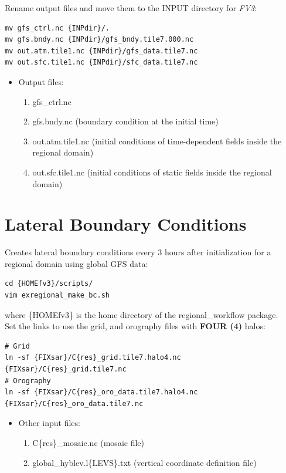 \documentclass[11pt,fleqn]{report}              %
\begin{document}
Rename output files and move them to the INPUT directory for {\it FV3}:
\lstset{language=bash}   
\begin{lstlisting}[frame=trBL]
mv gfs_ctrl.nc {INPdir}/.
mv gfs.bndy.nc {INPdir}/gfs_bndy.tile7.000.nc
mv out.atm.tile1.nc {INPdir}/gfs_data.tile7.nc
mv out.sfc.tile1.nc {INPdir}/sfc_data.tile7.nc
\end{lstlisting}

\begin{itemize}
\item Output files:
\begin{enumerate}
\item gfs\_ctrl.nc
\item gfs.bndy.nc (boundary condition at the initial time)
\item out.atm.tile1.nc (initial conditions of time-dependent fields inside the regional domain)
\item out.sfc.tile1.nc (initial conditions of static fields inside the regional domain)
\end{enumerate}
\end{itemize}





\section{Lateral Boundary Conditions}
\label{sec:glb2reg_bndr}


Creates lateral boundary conditions every 3 hours after initialization for a regional domain using global GFS data:
\lstset{language=bash}   
\begin{lstlisting}[frame=trBL]
cd {HOMEfv3}/scripts/
vim exregional_make_bc.sh
\end{lstlisting}
where \{HOMEfv3\} is the home directory of the regional\_workflow package. \\

Set the links to use the grid, and orography files with {\bf FOUR (4)} halos:
\lstset{language=bash}   
\begin{lstlisting}[frame=trBL]
# Grid
ln -sf {FIXsar}/C{res}_grid.tile7.halo4.nc {FIXsar}/C{res}_grid.tile7.nc
# Orography
ln -sf {FIXsar}/C{res}_oro_data.tile7.halo4.nc {FIXsar}/C{res}_oro_data.tile7.nc
\end{lstlisting}

\begin{itemize}
\item Other input files:
\begin{enumerate}
\item C\{res\}\_mosaic.nc (mosaic file)
\item global\_hyblev.l\{LEVS\}.txt (vertical coordinate definition file)
\end{enumerate}
\end{itemize}
\end{document}

